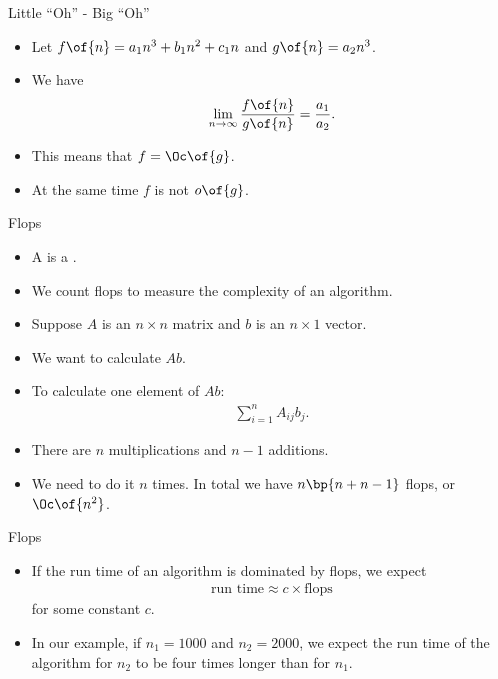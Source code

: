 \documentclass[11pt,xcolor={dvipsnames},aspectratio=159,hyperref={pdftex,pdfpagemode=UseNone,hidelinks,pdfdisplaydoctitle=true},usepdftitle=false]{beamer}
\begin{document}
\begin{frame}{Little ``Oh'' - Big ``Oh''}
    \begin{itemize}
     \item Let $f\of{n} = a_1 n^3 + b_1 n^2 + c_1 n $ and $g\of{n} = a_2 n^3$.
     \item We have \begin{align*}
         \lim_{n\rightarrow\infty}\frac{f\of{n}}{g\of{n}} = \frac{a_1}{a_2}.
     \end{align*}
     \item This means that $f = \Oc\of{g}$.
        \item At the same time $f$ is not $o\of{g}$.
    \end{itemize}
    \end{frame}

\begin{frame}{Flops}
    \begin{itemize}
     \item A  is a .
     \item We count flops to measure the complexity of an algorithm.
     \item Suppose $A$ is an $n\times n$ matrix and $b$ is an $n\times 1$ vector.
     \item We want to calculate $A b$.
     \item To calculate one element of $A b$: \begin{align*}
            \sum_{i=1}^n A_{ij} b_j.
     \end{align*}
     \item There are $n$ multiplications and $n-1$ additions.
     \item We need to do it $n$ times. In total we have $n \bp{n + n-1} $ flops, or $\Oc\of{n^2}$.    \end{itemize}
    \end{frame}


\begin{frame}{Flops}
    \begin{itemize}
        \item If the run time of an algorithm is dominated by flops, we expect \begin{align*}
            \text{run time} \approx c \times \text{flops} 
        \end{align*}
        for some constant $c$.
        \item In our example, if $n_1 = 1000$ and $n_2 = 2000$, we expect the run time of the algorithm for $n_2$ to be four times longer than for $n_1$.
    \end{itemize}

    \end{frame}
\end{document}
